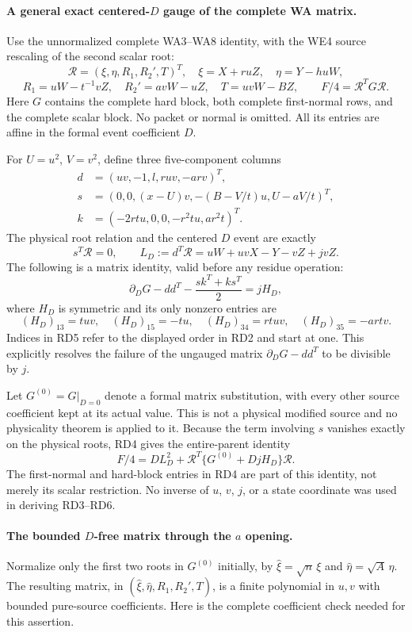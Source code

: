 \paragraph{A general exact centered-$D$ gauge of the complete WA matrix.}
Use the unnormalized complete WA3--WA8 identity, with the WE4 source
rescaling of the second scalar root:
\[
 \mathcal R=(\xi,\eta,R_1,R_2',T)^T,
 \quad \xi=X+ruZ,\quad\eta=Y-huW,
\]
\[
 R_1=uW-t^{-1}vZ,\quad R_2'=avW-uZ,\quad T=uvW-BZ,
 \qquad F/4=\mathcal R^TG\mathcal R.                \tag{RD2}
\]
Here $G$ contains the complete hard block, both complete first-normal
rows, and the complete scalar block. No packet or normal is omitted.
All its entries are affine in the formal event coefficient $D$.

For $U=u^2$, $V=v^2$, define three five-component columns
\begin{align*}
 d&=(uv,-1,l,ruv,-arv)^T,\\
 s&=(0,0,(x-U)v,-(B-V/t)u,U-aV/t)^T,\\
 k&=(-2rtu,0,0,-r^2tu,ar^2t)^T.
\end{align*}
The physical root relation and the centered $D$ event are exactly
\[
 s^T\mathcal R=0,\qquad
 L_D:=d^T\mathcal R
   =uW+uvX-Y-vZ+jvZ.                               \tag{RD3}
\]
The following is a matrix identity, valid before any residue operation:
\[
 \partial_DG-dd^T-\frac{sk^T+ks^T}{2}=jH_D,        \tag{RD4}
\]
where $H_D$ is symmetric and its only nonzero entries are
\[
 (H_D)_{13}=tuv,\quad (H_D)_{15}=-tu,\quad
 (H_D)_{34}=rtuv,\quad (H_D)_{35}=-artv.           \tag{RD5}
\]
Indices in RD5 refer to the displayed order in RD2 and start at one.
This explicitly resolves the failure of the ungauged matrix
$\partial_DG-dd^T$ to be divisible by $j$.

Let $G^{(0)}=G|_{D=0}$ denote a formal matrix substitution, with every
other source coefficient kept at its actual value. This is not a
physical modified source and no physicality theorem is applied to it.
Because the term involving $s$ vanishes exactly on the physical roots,
RD4 gives the entire-parent identity
\[
 F/4=D L_D^2+\mathcal R^T\{G^{(0)}+DjH_D\}\mathcal R.
                                                               \tag{RD6}
\]
The first-normal and hard-block entries in RD4 are part of this identity,
not merely its scalar restriction. No inverse of $u$, $v$, $j$, or a
state coordinate was used in deriving RD3--RD6.

\paragraph{The bounded $D$-free matrix through the $a$ opening.}
Normalize only the first two roots in $G^{(0)}$ initially, by
$\widehat\xi=\sqrt n\,\xi$ and $\widehat\eta=\sqrt A\,\eta$.
The resulting matrix, in
$(\widehat\xi,\widehat\eta,R_1,R_2',T)$, is a finite polynomial in
$u,v$ with bounded pure-source coefficients. Here is the complete
coefficient check needed for this assertion.

